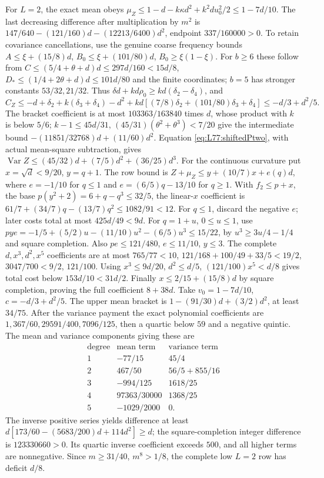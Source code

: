 For $L=2$, the exact mean obeys
$\mu_Z\le1-d-k\kappa d^2+k^2du_0^2/2\le1-7d/10$.
The last decreasing difference after multiplication by $m^2$ is
$147/640-(121/160)d-(12213/6400)d^2$, endpoint $337/160000>0$.
To retain covariance cancellations, use the genuine coarse frequency
bounds $A\le\xi+(15/8)d$, $B_0\le\xi+(101/80)d$,
$B_0\ge\xi(1-\xi)$.
For $b\ge6$ these follow from
$C\le(5/4+\theta+d)d\le297d/160<15d/8$,
$D_*\le(1/4+2\theta+d)d\le101d/80$ and the finite coordinates;
$b=5$ has stronger constants $53/32,21/32$.
Thus $\delta d+kd\rho_0\ge kd(\delta_2-\delta_4)$, and
\[
C_Z\le-d+\delta_2+k(\delta_3+\delta_4)-d^2
+kd[(7/8)\delta_2+(101/80)\delta_3+\delta_4]
\le-d/3+d^2/5.
\]
The bracket coefficient is at most $103363/163840$ times $d$,
whose product with $k$ is below $5/6$;
$k-1\le45d/31$, $(45/31)(\theta^2+\theta^3)<7/20$ give the
intermediate bound $-(11851/32768)d+(11/60)d^2$.
Equation \eqref{eq:L77:shiftedPtwo}, with actual mean-square
subtraction, gives
$\operatorname{Var}Z\le(45/32)d+(7/5)d^2+(36/25)d^3$.
For the continuous curvature put $x=\sqrt d<9/20$, $y=q+1$.
The row bound is $Z+\mu_Z\le y+(10/7)x+e(q)d$, where
$e=-1/10$ for $q\le1$ and $e=(6/5)q-13/10$ for $q\ge1$.
With $f_2\le p+x$, the base $p(y^2+2)=6+q-q^3\le32/5$,
the linear-$x$ coefficient is
$61/7+(34/7)q-(13/7)q^2\le1082/91<12$.
For $q\le1$, discard the negative $e$; later costs total at most
$425d/49<9d$.
For $q=1+u$, $0\le u\le1$, use
$pye=-1/5+(5/2)u-(11/10)u^2-(6/5)u^3\le15/22$,
by $u^3\ge3u/4-1/4$ and square completion.
Also $pe\le121/480$, $e\le11/10$, $y\le3$.
The complete $d,x^3,d^2,x^5$ coefficients are at most
$765/77<10$, $121/168+100/49+33/5<19/2$,
$3047/700<9/2$, $121/100$.
Using $x^3\le9d/20$, $d^2\le d/5$, $(121/100)x^5<d/8$ gives
total cost below $153d/10<31d/2$.
Finally $x\le2/15+(15/8)d$ by square completion, proving the full
coefficient $8+38d$.
Take $v_0=1-7d/10$, $c=-d/3+d^2/5$.
The upper mean bracket is $1-(91/30)d+(3/2)d^2$, at least $34/75$.
After the variance payment the exact polynomial coefficients are
$1,367/60,29591/400,7096/125$, then a quartic below $59$ and a
negative quintic. The mean and variance components giving these are
\[
\begin{array}{c|cc}
\text{degree}&\text{mean term}&\text{variance term}\\\hline
1&-77/15&45/4\\2&467/50&56/5+855/16\\
3&-994/125&1618/25\\4&97363/30000&1368/25\\5&-1029/2000&0.
\end{array}
\]
The inverse positive series yields difference at least
$d[173/60-(5683/200)d+114d^2]\ge d$;
the square-completion integer difference is $123330660>0$.
Its quartic inverse coefficient exceeds $500$, and all higher terms
are nonnegative. Since $m\ge31/40$, $m^8>1/8$, the complete low
$L=2$ row has deficit $d/8$.

